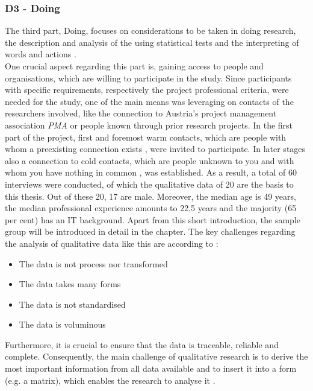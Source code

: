 \subsubsection{D3 - Doing}
The third part, Doing, focuses on considerations to be taken in doing research, the description and analysis of the using statistical tests and the interpreting of words and actions \cite{maylor17}.\\
One crucial aspect regarding this part is, gaining access to people and organisations, which are willing to participate in the study. Since participants with specific requirements, respectively the project professional criteria, were needed for the study, one of the main means was leveraging on contacts of the researchers involved, like the connection to Austria's project management association \textit{PMA} or people known through prior research projects. In the first part of the project, first and foremost warm contacts, which are people with whom a preexisting connection exists \cite{maylor17}, were invited to participate. In later stages also a connection to cold contacts, which are people unknown to you and with whom you have nothing in common \cite{maylor17}, was established. As a result, a total of 60 interviews were conducted, of which the qualitative data of 20 are the basis to this thesis. Out of these 20, 17 are male. Moreover, the median age is 49 years, the median professional experience amounts to 22,5 years and the majority (65 per cent) has an IT background. Apart from this short introduction, the sample group will be introduced in detail in the  chapter. The key challenges regarding the analysis of qualitative data like this are according to :
\begin{itemize}[itemsep=0.05cm]
    \item The data is not process nor transformed
    \item The data takes many forms
    \item The data is not standardised
    \item The data is voluminous 
\end{itemize}
Furthermore, it is crucial to ensure that the data is traceable, reliable and complete. Consequently, the main challenge of qualitative research is to derive the most important information from all data available and to insert it into a form (e.g. a matrix), which enables the research to analyse it \cite{maylor17}.\\
